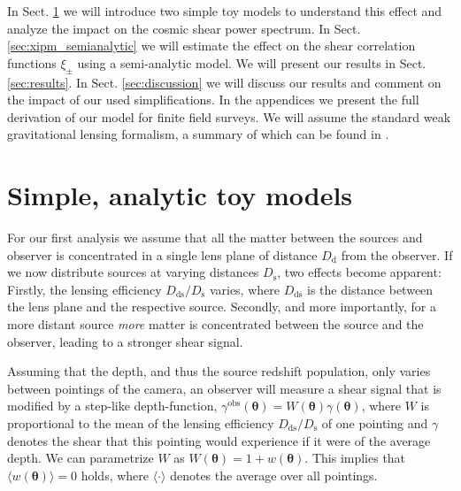 \documentclass{aa}
\renewcommand{\rm}{\mathrm}
\def\b#1{\bm{#1}}
\def\Dds{D_{\rm{ds}}}
\def\Ds{D_{\rm{s}}}
\def\gammao{\gamma^{\text{obs}}}
\begin{document}
%

In Sect. \ref{sec:analytic_models} we will introduce two simple toy models to understand this effect and analyze the impact on the cosmic shear power spectrum. In Sect. \ref{sec:xipm_semianalytic} we will estimate the effect on the shear correlation functions $\xi_\pm$ using a semi-analytic model. We will present our results in Sect. \ref{sec:results}. In Sect. \ref{sec:discussion} we will discuss our results and comment on the impact of our used simplifications. In the appendices we present the full derivation of our model for finite field surveys.
We will assume the standard weak gravitational lensing formalism, a summary of which can be found in \citet{2001PhR...340..291B}.

\section{Simple, analytic toy models}
\label{sec:analytic_models}
For our first analysis we assume that all the matter between the sources and observer is concentrated in a single lens plane of distance $D_{\rm d}$ from the observer. If we now distribute sources at varying distances $D_{\rm s}$, two effects become apparent: Firstly, the lensing efficiency $D_{\rm{ds}}/D_{\rm s}$ varies, where $D_{\rm{ds}}$ is the distance between the lens plane and the respective source. Secondly, and more importantly, for a more distant source \emph{more} matter is concentrated between the source and the observer, leading to a stronger shear signal.

Assuming that the depth, and thus the source redshift population, only varies between pointings of the camera, an observer will measure a shear signal that is modified by a step-like depth-function, $\gammao(\b\theta)=W(\b \theta)\gamma(\b\theta)$, where $W$ is proportional to the mean of the lensing efficiency $\Dds/\Ds$ of one pointing and $\gamma$ denotes the shear that this pointing would experience if it were of the average depth.
We can parametrize $W$ as $W(\bm{\theta}) = 1+w(\bm{\theta})$. This implies that $\langle w(\bm{\theta})\rangle=0$ holds, where $\langle \cdot\rangle$ denotes the average over all pointings.
\end{document}
